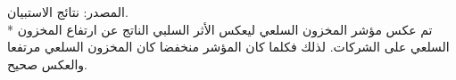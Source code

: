 المصدر: نتائج الاستبيان.\\
* تم عكس مؤشر المخزون السلعي ليعكس الأثر السلبي الناتج عن ارتفاع المخزون السلعي على الشركات. لذلك فكلما كان المؤشر منخفضا كان المخزون السلعي مرتفعا والعكس صحيح.